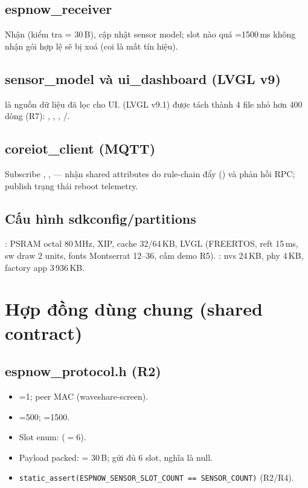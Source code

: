 \subsection{espnow\_receiver}
Nhận  (kiểm tra  = 30\,B), cập nhật
sensor model; slot nào quá =1500\,ms không nhận gói hợp lệ
sẽ bị xoá (coi là mất tín hiệu).

\subsection{sensor\_model và ui\_dashboard (LVGL v9)}
 là nguồn dữ liệu đã lọc cho UI.  (LVGL v9.1) được
tách thành 4 file nhỏ hơn 400 dòng (R7): , ,
, /.

\subsection{coreiot\_client (MQTT)}
Subscribe , ,
 — nhận shared attributes do rule-chain đẩy
() và phản hồi RPC; publish trạng thái reboot telemetry.

\subsection{Cấu hình sdkconfig/partitions}
: PSRAM octal 80\,MHz, XIP, cache 32/64\,KB, LVGL (FREERTOS,
reft 15\,ms, sw draw 2 units, fonts Montserrat 12--36, cấm demo R5). :
nvs 24\,KB, phy 4\,KB, factory app 3\,936\,KB.

\section{Hợp đồng dùng chung (shared contract)}
\label{sec:sys-contract}

\subsection{espnow\_protocol.h (R2)}
\begin{itemize}
\item {}=1; peer MAC  (waveshare-screen).
\item {}=500; =1500.
\item Slot enum:  ($=$6).
\item Payload packed:  = 30\,B; gửi đủ 6 slot,  nghĩa là null.
\item \verb+static_assert(ESPNOW_SENSOR_SLOT_COUNT == SENSOR_COUNT)+ (R2/R4).
\end{itemize}

